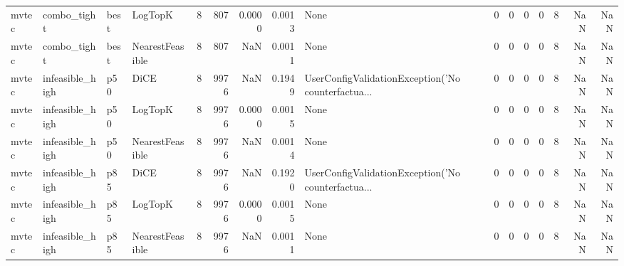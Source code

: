 \begin{tabular}{llllrrrrlrrrrrrr}
  mvtec &          combo\_tight &   best &         LogTopK &            8 &                  807 &                   0.0000 &      0.0013 &                                               None &      0 &            0 &        0 &              0 &          8 &                NaN &            NaN \\
  mvtec &          combo\_tight &   best & NearestFeasible &            8 &                  807 &                      NaN &      0.0011 &                                               None &      0 &            0 &        0 &              0 &          8 &                NaN &            NaN \\
  mvtec &      infeasible\_high &    p50 &            DiCE &            8 &                 9976 &                      NaN &      0.1949 & UserConfigValidationException('No counterfactua... &      0 &            0 &        0 &              0 &          8 &                NaN &            NaN \\
  mvtec &      infeasible\_high &    p50 &         LogTopK &            8 &                 9976 &                   0.0000 &      0.0015 &                                               None &      0 &            0 &        0 &              0 &          8 &                NaN &            NaN \\
  mvtec &      infeasible\_high &    p50 & NearestFeasible &            8 &                 9976 &                      NaN &      0.0014 &                                               None &      0 &            0 &        0 &              0 &          8 &                NaN &            NaN \\
  mvtec &      infeasible\_high &    p85 &            DiCE &            8 &                 9976 &                      NaN &      0.1920 & UserConfigValidationException('No counterfactua... &      0 &            0 &        0 &              0 &          8 &                NaN &            NaN \\
  mvtec &      infeasible\_high &    p85 &         LogTopK &            8 &                 9976 &                   0.0000 &      0.0015 &                                               None &      0 &            0 &        0 &              0 &          8 &                NaN &            NaN \\
  mvtec &      infeasible\_high &    p85 & NearestFeasible &            8 &                 9976 &                      NaN &      0.0011 &                                               None &      0 &            0 &        0 &              0 &          8 &                NaN &            NaN \\

\end{tabular}
